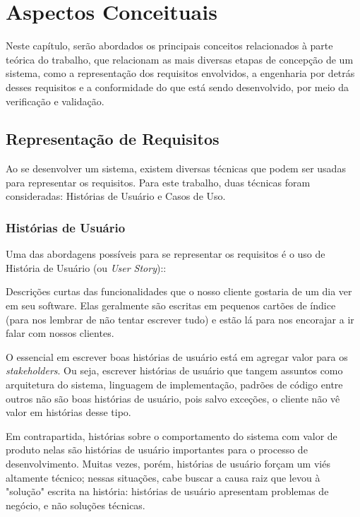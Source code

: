 \chapter{Aspectos Conceituais}\label{chap:aspectos-conceituais}
Neste capítulo, serão abordados os principais conceitos relacionados à parte teórica do trabalho, que relacionam as mais diversas etapas de concepção de um sistema, como a representação dos requisitos envolvidos, a engenharia por detrás desses requisitos e a conformidade do que está sendo desenvolvido, por meio da verificação e validação.

\section{Representação de Requisitos}
Ao se desenvolver um sistema, existem diversas técnicas que podem ser usadas para representar os requisitos. Para este trabalho, duas técnicas foram consideradas: Histórias de Usuário e Casos de Uso.

\subsection{Histórias de Usuário}
Uma das abordagens possíveis para se representar os requisitos é o uso de História de Usuário (ou \textit{User Story}):\cite{jonathanrasmusson}:

\begin{citacaoLonga}
Descrições curtas das funcionalidades que o nosso cliente
gostaria de um dia ver em seu software. Elas geralmente são escritas em pequenos cartões de índice (para nos lembrar de não tentar escrever tudo) e estão lá para nos encorajar a ir falar com nossos clientes.
\end{citacaoLonga}

O essencial em escrever boas histórias de usuário está em agregar valor para os \textit{stakeholders}. Ou seja, escrever histórias de usuário que tangem assuntos como arquitetura do sistema, linguagem de implementação, padrões de código entre outros não são boas histórias de usuário, pois salvo exceções, o cliente não vê valor em histórias desse tipo\cite{jonathanrasmusson}.

Em contrapartida, histórias sobre o comportamento do sistema com valor de produto nelas são histórias de usuário importantes para o processo de desenvolvimento. Muitas vezes, porém, histórias de usuário forçam um viés altamente técnico; nessas situações, cabe buscar a causa raiz que levou à "solução" escrita na história: histórias de usuário apresentam problemas de negócio, e não soluções técnicas.

